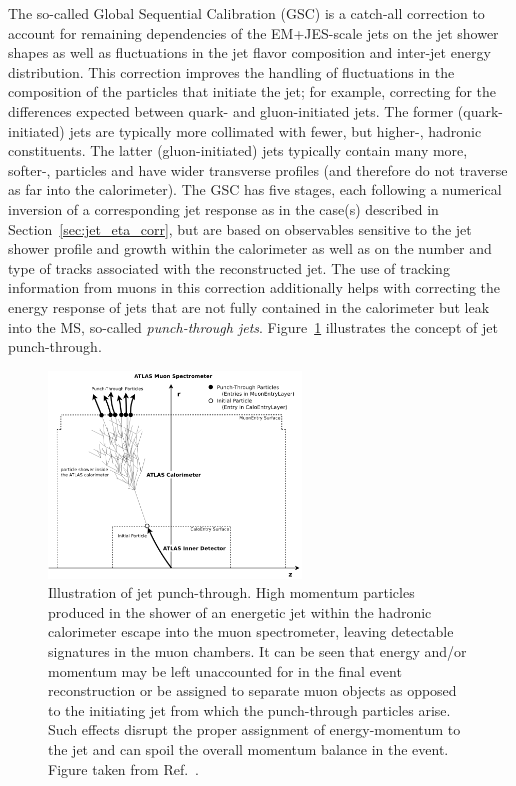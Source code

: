 The so-called Global Sequential Calibration (GSC) is a catch-all correction to account for remaining dependencies
of the EM+JES-scale jets on the jet shower shapes as well as fluctuations in the jet flavor composition and inter-jet energy distribution.
This correction improves the handling of fluctuations in the composition of the particles that initiate the jet; for example, correcting for the differences expected between quark- and gluon-initiated jets.
The former (quark-initiated) jets are typically more collimated with fewer, but higher-\pT, hadronic constituents.
The latter (gluon-initiated) jets typically contain many more, softer-\pT, particles and have wider transverse profiles
(and therefore do not traverse as far into the calorimeter).
The GSC has five stages, each following a numerical inversion of a corresponding jet response as in the case(s)
described in Section~\ref{sec:jet_eta_corr}, but are based on observables sensitive to the jet shower profile and growth
within the calorimeter as well as on the number and type of tracks associated with the reconstructed jet.
The use of tracking information from muons in this correction additionally helps with correcting the energy response of jets that
are not fully contained in the calorimeter but leak into the MS, so-called \textit{punch-through jets}.
Figure~\ref{fig:jet_punch_through} illustrates the concept of jet punch-through.

\begin{figure}[!htb]
    \begin{center}
        \includegraphics[width=0.6\textwidth]{figures/chapter3/jets/jet_punch_through}
        \caption{
            Illustration of jet punch-through.
            High momentum particles produced in the shower of an energetic jet within
            the hadronic calorimeter escape into the muon spectrometer, leaving detectable
            signatures in the muon chambers.
            It can be seen that energy and/or momentum may be left unaccounted for in the final event reconstruction or be assigned to separate muon objects as opposed to the
            initiating jet from which the punch-through particles arise.
            Such effects disrupt the proper
            assignment of energy-momentum to the jet and can spoil the overall momentum balance in the event.
            Figure taken from Ref.~\cite{Ritsch:1388275}.
        }
        \label{fig:jet_punch_through}
    \end{center}
\end{figure}

